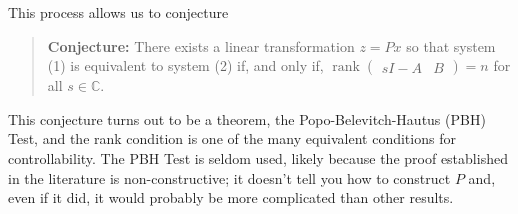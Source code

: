 %
This process allows us to conjecture
%
\begin{quote}
  \textbf{Conjecture:}
  There exists a linear transformation \(z = P x\) so that system (1) is equivalent to system (2) if, and only if,
  \(
    \operatorname{rank}\left(
      \begin{array}{l|l}
        s I - A & B
      \end{array}
    \right)
    =
    n
  \)
  for all \(s \in \mathbb{C}.\)
\end{quote}
This conjecture turns out to be a theorem, the Popo-Belevitch-Hautus (PBH) Test, and the rank condition is one of the many equivalent conditions for controllability.
The PBH Test is seldom used, likely because the proof established in the literature is non-constructive;
it doesn't tell you how to construct \(P\) and, even if it did, it would probably be more complicated than other results.

